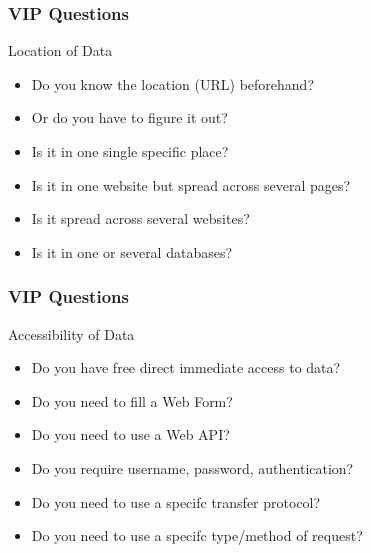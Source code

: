 \documentclass{beamer}\usepackage[]{graphicx}\usepackage[]{color}
\begin{document}

\begin{frame}
\frametitle{VIP Questions}

\begin{block}{Location of Data}
 \begin{itemize}
  \item Do you know the location (URL) beforehand?
  \item[] Or do you have to figure it out? \\
  \item Is it in one single specific place? \\
  \item Is it in one website but spread across several pages? \\
  \item Is it spread across several websites? \\
  \item Is it in one or several databases?
 \end{itemize}
\end{block}

\end{frame}


\begin{frame}
\frametitle{VIP Questions}

\begin{block}{Accessibility of Data}
 \begin{itemize}
  \item Do you have free direct immediate access to data?
  \item Do you need to fill a Web Form?
  \item Do you need to use a Web API?
  \item Do you require username, password, authentication?
  \item Do you need to use a specifc transfer protocol?
  \item Do you need to use a specifc type/method of request?
 \end{itemize}
\end{block}

\end{frame}


\end{document}
